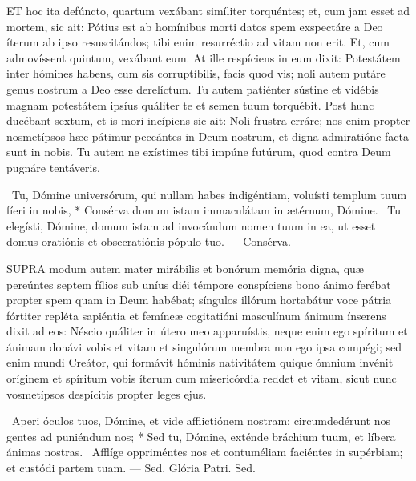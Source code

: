 \lettrine[lines=2]{E}{T} hoc ita defúncto, quartum vexábant simíliter torquéntes; et, cum jam esset ad mortem, sic ait: Pótius est ab homínibus morti datos spem exspectáre a Deo íterum ab ipso resuscitándos; tibi enim resurréctio ad vitam non erit. Et, cum admovíssent quintum, vexábant eum. At ille respíciens in eum dixit: Potestátem inter hómines habens, cum sis corruptíbilis, facis quod vis; noli autem putáre genus nostrum a Deo esse derelíctum. Tu autem patiénter sústine et vidébis magnam potestátem ipsíus quáliter te et semen tuum torquébit. Post hunc ducébant sextum, et is mori incípiens sic ait: Noli frustra erráre; nos enim propter nosmetípsos hæc pátimur peccántes in Deum nostrum, et digna admiratióne facta sunt in nobis. Tu autem ne exístimes tibi impúne futúrum, quod contra Deum pugnáre tentáveris.

\R\ Tu, Dómine universórum, qui nullam habes indigéntiam, voluísti templum tuum fíeri in nobis, * Consérva domum istam immaculátam in ætérnum, Dómine. \V\ Tu elegísti, Dómine, domum istam ad invocándum nomen tuum in ea, ut esset domus oratiónis et obsecratiónis pópulo tuo. — Consérva.



\lettrine[lines=2]{S}{UPRA} modum autem mater mirábilis et bonórum memória digna, quæ pereúntes septem fílios sub uníus diéi témpore conspíciens bono ánimo ferébat propter spem quam in Deum habébat; síngulos illórum hortabátur voce pátria fórtiter repléta sapiéntia et femíneæ cogitatióni masculínum ánimum ínserens dixit ad eos: Néscio quáliter in útero meo apparuístis, neque enim ego spíritum et ánimam donávi vobis et vitam et singulórum membra non ego ipsa compégi; sed enim mundi Creátor, qui formávit hóminis nativitátem quique ómnium invénit oríginem et spíritum vobis íterum cum misericórdia reddet et vitam, sicut nunc vosmetípsos despícitis propter leges ejus.

\R\ Aperi óculos tuos, Dómine, et vide afflictiónem nostram: circumdedérunt nos gentes ad puniéndum nos; * Sed tu, Dómine, exténde bráchium tuum, et líbera ánimas nostras. \V\ Afflíge oppriméntes nos et contuméliam faciéntes in supérbiam; et custódi partem tuam. — Sed. Glória Patri. Sed.





